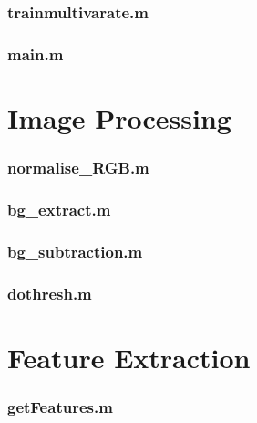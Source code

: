 \subsubsection*{\hypertarget{trainclf}{trainmultivarate.m}}


\subsubsection*{\hypertarget{main}{main.m}}


\newpage
\section{Image Processing}
\subsubsection*{\hypertarget{normRGB}{normalise\_RGB.m}}


\subsubsection*{\hypertarget{bgextract}{bg\_extract.m}}


\subsubsection*{\hypertarget{bgsub}{bg\_subtraction.m}}


\subsubsection*{\hypertarget{dothresh}{dothresh.m}}


\newpage
\section{Feature Extraction}
\subsubsection*{\hypertarget{getfeatures}{getFeatures.m}}


